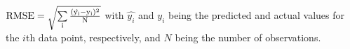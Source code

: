 $\rm{RMSE}=\sqrt{\sum\limits_{i}\frac{(\hat{y_i}-y_i)^2}{N}}$
with $\hat{y_i}$ and $y_i$ being the predicted and actual values for the $i$th data point, respectively, and $N$ being the number of observations.